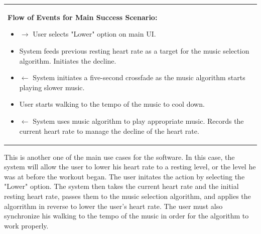 \documentclass[letterpaper,english, 12pt]{scrreprt}
\begin{document}
\begin{center}
\begin{tabular}{|C{15cm}|}
\begin{flushleft}
                                \textbf{Flow of Events for Main Success Scenario: }
                        \end{flushleft}
                                \begin{itemize}
                                        \item $\rightarrow$ User selects "Lower" option on main UI.
                                        \item System feeds previous resting heart rate as a target for the music selection algorithm. Initiates the decline.
                                        \item $\leftarrow$ System initiates a five-second crossfade as the music algorithm starts playing slower music.
                                        \item User starts walking to the tempo of the music to cool down.
                                        \item $\leftarrow$ System uses music algorithm to play appropriate music. Records the current heart rate to manage the decline of the heart rate.
                                \end{itemize}
                \hline
        \end{tabular}
\end{center}

This is another one of the main use cases for the software. In this case, the system will allow the user to lower his heart rate to a resting level, or the level he was at before the workout began. The user initates the action by selecting the "Lower" option. The system then takes the current heart rate and the initial resting heart rate, passes them to the music selection algorithm, and applies the algorrithm in reverse to lower the user's heart rate. The user must also synchronize his walking to the tempo of the music in order for the algorithm to work properly.
\end{document}
